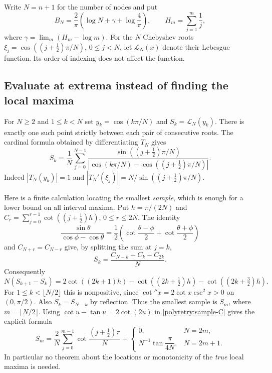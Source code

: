 \documentclass[11pt]{article}
\theoremstyle{remark}
\numberwithin{equation}{section}
\begin{document}
Write $N=n+1$ for the number of nodes and put
\[
 B_N=\frac2\pi\left(\log N+\gamma+\log\frac4\pi\right),
 \qquad H_m=\sum_{j=1}^{m}\frac1j,
\]
where $\gamma=\lim_m(H_m-\log m)$.
For the $N$ Chebyshev roots
$\xi_j=\cos((j+\tfrac12)\pi/N)$, $0\le j<N$, let
$\mathcal L_N(x)$ denote their Lebesgue function.  Its order of indexing
does not affect the function.

\subsection{Evaluate at extrema instead of finding the local maxima}
\label{polyretry:cotangent-samples}

For $N\ge2$ and $1\le k<N$ set $y_k=\cos(k\pi/N)$ and
$S_k=\mathcal L_N(y_k)$.  There is exactly one such point strictly
between each pair of consecutive roots.  The cardinal formula obtained
by differentiating $T_N$ gives
\begin{equation}\label{polyretry:sample}
 S_k=\frac1N\sum_{j=0}^{N-1}
 \frac{\sin((j+\tfrac12)\pi/N)}
 {|\cos(k\pi/N)-\cos((j+\tfrac12)\pi/N)|}.
\end{equation}
Indeed $|T_N(y_k)|=1$ and
$|T_N'(\xi_j)|=N/\sin((j+\tfrac12)\pi/N)$.

Here is a finite calculation locating the smallest \emph{sample},
which is enough for a lower bound on all interval maxima.  Put
$h=\pi/(2N)$ and
$C_r=\sum_{j=0}^{r-1}\cot((j+\tfrac12)h)$, $0\le r\le2N$.
The identity
\[
 \frac{\sin\theta}{\cos\phi-\cos\theta}
 =\frac12\left(\cot\frac{\theta-\phi}{2}
                  +\cot\frac{\theta+\phi}{2}\right)
\]
and $C_{N+r}=C_{N-r}$ give, by splitting the sum at $j=k$,
\begin{equation}\label{polyretry:sample-C}
 S_k=\frac{C_{N-k}+C_k-C_{2k}}N.
\end{equation}
Consequently
\[
 N(S_{k+1}-S_k)=2\cot((2k+1)h)
 -\cot((2k+\tfrac12)h)-\cot((2k+\tfrac32)h).
\]
For $1\le k<\lfloor N/2\rfloor$ this is nonpositive, since
$\cot''x=2\cot x\csc^2x>0$ on $(0,\pi/2)$.
Also $S_k=S_{N-k}$ by reflection.  Thus the smallest sample is
$S_m$, where $m=\lfloor N/2\rfloor$.
Using $\cot u-\tan u=2\cot(2u)$ in
\eqref{polyretry:sample-C} gives the explicit formula
\begin{equation}\label{polyretry:central-cot}
 S_m=\frac2N\sum_{j=0}^{m-1}
       \cot\frac{(j+\tfrac12)\pi}{N}
 +\begin{cases}
 0,&N=2m,\\[2pt]
 N^{-1}\tan\dfrac{\pi}{4N},&N=2m+1.
 \end{cases}
\end{equation}
In particular no theorem about the locations or monotonicity of the
\emph{true} local maxima is needed.
\end{document}
